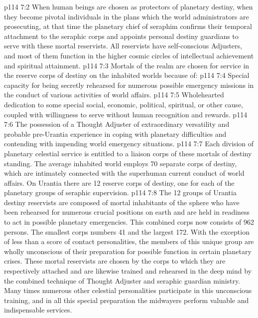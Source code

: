 \vs p114 7:2 When human beings are chosen as protectors of planetary destiny, when they become pivotal individuals in the plans which the world administrators are prosecuting, at that time the planetary chief of seraphim confirms their temporal attachment to the seraphic corps and appoints personal destiny guardians to serve with these mortal reservists. All reservists have self\hyp{}conscious Adjusters, and most of them function in the higher cosmic circles of intellectual achievement and spiritual attainment.
\vs p114 7:3 Mortals of the realm are chosen for service in the reserve corps of destiny on the inhabited worlds because of:
\vs p114 7:4 \bibnobreakspace Special capacity for being secretly rehearsed for numerous possible emergency missions in the conduct of various activities of world affairs.
\vs p114 7:5 \bibnobreakspace Wholehearted dedication to some special social, economic, political, spiritual, or other cause, coupled with willingness to serve without human recognition and rewards.
\vs p114 7:6 \bibnobreakspace The possession of a Thought Adjuster of extraordinary versatility and probable pre\hyp{}Urantia experience in coping with planetary difficulties and contending with impending world emergency situations.
\vs p114 7:7 \pc Each division of planetary celestial service is entitled to a liaison corps of these mortals of destiny standing. The average inhabited world employs 70 separate corps of destiny, which are intimately connected with the superhuman current conduct of world affairs. On Urantia there are 12 reserve corps of destiny, one for each of the planetary groups of seraphic supervision.
\vs p114 7:8 The 12 groups of Urantia destiny reservists are composed of mortal inhabitants of the sphere who have been rehearsed for numerous crucial positions on earth and are held in readiness to act in possible planetary emergencies. This combined corps now consists of 962 persons. The smallest corps numbers 41 and the largest 172. With the exception of less than a score of contact personalities, the members of this unique group are wholly unconscious of their preparation for possible function in certain planetary crises. These mortal reservists are chosen by the corps to which they are respectively attached and are likewise trained and rehearsed in the deep mind by the combined technique of Thought Adjuster and seraphic guardian ministry. Many times numerous other celestial personalities participate in this unconscious training, and in all this special preparation the midwayers perform valuable and indispensable services.
